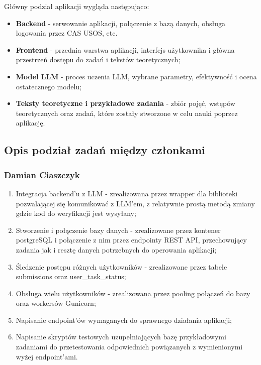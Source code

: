 \documentclass[12pt,a4paper]{article}
\begin{document}
Główny podział aplikacji wygląda następująco:
\begin{itemize}
    \item \textbf{Backend} - serwowanie aplikacji, połączenie z bazą danych, obsługa logowania przez CAS USOS, etc.
    \item \textbf{Frontend} - przednia warstwa aplikacji, interfejs użytkownika i główna przestrzeń dostępu do zadań i tekstów teoretycznych;
    \item \textbf{Model LLM} - proces uczenia LLM, wybrane parametry, efektywność i ocena ostatecznego modelu;
    \item \textbf{Teksty teoretyczne i przykładowe zadania} - zbiór pojęć, wstępów teoretycznych oraz zadań, które zostały stworzone w celu nauki poprzez aplikację. 
\end{itemize}

\subsection{Opis podział zadań między członkami}
\label{ssec:task_division}
\subsubsection*{Damian Ciaszczyk}
 
\begin{enumerate}
    \item Integracja backend'u z LLM - zrealizowana przez wrapper dla biblioteki pozwalającej się komunikować z LLM'em, z relatywnie prostą metodą zmiany gdzie kod do weryfikacji jest wysyłany;
    \item Stworzenie i połączenie bazy danych - zrealizowane przez kontener postgreSQL i połączenie z nim przez endpointy REST API, przechowujący zadania jak i resztę danych potrzebnych do operowania aplikacji;
    \item Śledzenie postępu różnych użytkowników - zrealizowane przez tabele submissions oraz user\_task\_status;
    \item Obsługa wielu użytkowników - zrealizowana przez pooling połączeń do bazy oraz workersów Gunicorn;
    \item Napisanie endpoint'ów wymaganych do sprawnego działania aplikacji;
    \item Napisanie skryptów testowych uzupełniających bazę przykładowymi zadaniami do przetestowania odpowiednich powiązanych z wymienionymi wyżej endpoint'ami.
\end{enumerate}
\end{document}
